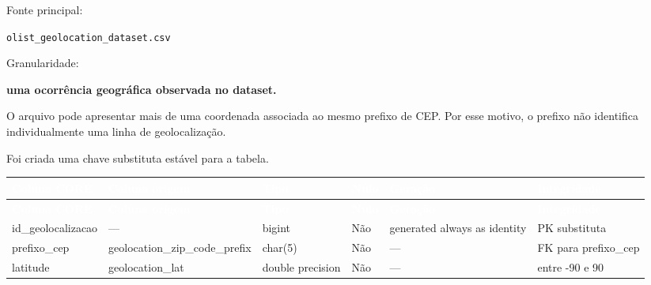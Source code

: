 \documentclass[12pt,a4paper]{article}
\begin{document}
{	Fonte principal:
	
	\texttt{olist\_geolocation\_dataset.csv}
	
	Granularidade:
	
	\textbf{uma ocorrência geográfica observada no dataset.}
	
	O arquivo pode apresentar mais de uma coordenada associada ao mesmo
	prefixo de CEP. Por esse motivo, o prefixo não identifica
	individualmente uma linha de geolocalização.
	
	Foi criada uma chave substituta estável para a tabela.
	
		
		{\small
			\renewcommand{\arraystretch}{1.18}
			
			\begin{longtable}{
					|>{\raggedright\arraybackslash}p{2.4cm}|
					>{\raggedright\arraybackslash}p{3cm}|
					>{\raggedright\arraybackslash}p{1.8cm}|
					>{\centering\arraybackslash}p{1.1cm}|
					>{\raggedright\arraybackslash}p{2cm}|
					>{\raggedright\arraybackslash}p{3.5cm}|
				}
				
				\hline
				\rowcolor{AzulCorporativo}
				
				\textcolor{white}{\textbf{Coluna CORE}} &
				\textcolor{white}{\textbf{Coluna origem}} &
				\textcolor{white}{\textbf{Tipo}} &
				\textcolor{white}{\textbf{Nulo}} &
				\textcolor{white}{\textbf{Geração}} &
				\textcolor{white}{\textbf{Integridade}}
				\\ \hline
				
				\endfirsthead
				
				\hline
				\rowcolor{AzulCorporativo}
				
				\textcolor{white}{\textbf{Coluna CORE}} &
				\textcolor{white}{\textbf{Coluna origem}} &
				\textcolor{white}{\textbf{Tipo}} &
				\textcolor{white}{\textbf{Nulo}} &
				\textcolor{white}{\textbf{Geração}} &
				\textcolor{white}{\textbf{Integridade}}
				\\ \hline
				
				\endhead
				
				id\_\allowbreak geolocalizacao
				&
				---
				&
				bigint
				&
				Não
				&
				generated always as identity
				&
				PK substituta
				\\ \hline
				
				prefixo\_cep
				&
				geolocation\_zip\_\allowbreak code\_prefix
				&
				char(5)
				&
				Não
				&
				---
				&
				FK para prefixo\_cep
				\\ \hline
				
				latitude
				&
				geolocation\_lat
				&
				double precision
				&
				Não
				&
				---
				&
				entre -90 e 90
				\\ \hline
				

\end{longtable}}}
\end{document}

